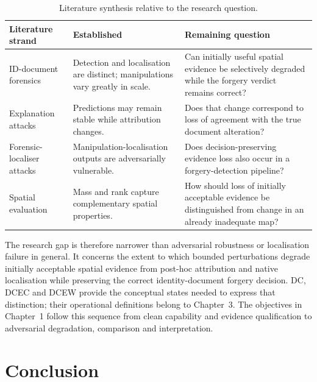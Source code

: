 \begin{table}[htbp]
\centering
\small
\renewcommand{\arraystretch}{1.12}
\caption{Literature synthesis relative to the research question.}
\label{tab:lr-gap}
\begin{tabularx}{\textwidth}{@{}
>{\raggedright\arraybackslash}p{}
>{\raggedright\arraybackslash}X
>{\raggedright\arraybackslash}X@{}}
\toprule
Literature strand & Established & Remaining question \\
\midrule
ID-document forensics
\citep{korshunov2025fantasyid,korshunov2025deepid}
&
Detection and localisation are distinct; manipulations vary greatly in scale.
&
Can initially useful spatial evidence be selectively degraded while the forgery verdict remains correct?
\\

Explanation attacks
\citep{ghorbani2019fragile,dombrowski2019explanations}
&
Predictions may remain stable while attribution changes.
&
Does that change correspond to loss of agreement with the true document alteration?
\\

Forensic-localiser attacks
\citep{cao2024transferable,shao2024documentrobustness}
&
Manipulation-localisation outputs are adversarially vulnerable.
&
Does decision-preserving evidence loss also occur in a forgery-detection pipeline?
\\

Spatial evaluation
\citep{wang2020scorecam,arras2022clevrxai}
&
Mass and rank capture complementary spatial properties.
&
How should loss of initially acceptable evidence be distinguished from change in an already inadequate map?
\\
\bottomrule
\end{tabularx}
\end{table}

The research gap is therefore narrower than adversarial robustness or localisation failure in general. It concerns the extent to which bounded perturbations degrade initially acceptable spatial evidence from post-hoc attribution and native localisation while preserving the correct identity-document forgery decision. DC, DCEC and DCEW provide the conceptual states needed to express that distinction; their operational definitions belong to Chapter~3. The objectives in Chapter~1 follow this sequence from clean capability and evidence qualification to adversarial degradation, comparison and interpretation.


\section{Conclusion}
\label{sec:lr-conclusion}

